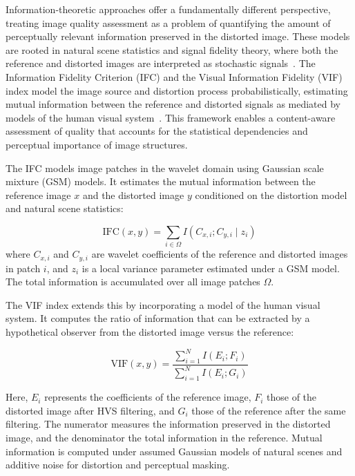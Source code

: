 Information-theoretic approaches offer a fundamentally different perspective, treating image quality assessment as a problem of quantifying the amount of perceptually relevant information preserved in the distorted image. These models are rooted in natural scene statistics and signal fidelity theory, where both the reference and distorted images are interpreted as stochastic signals~\cite{sheikh2005ifc}. The Information Fidelity Criterion (IFC) and the Visual Information Fidelity (VIF) index model the image source and distortion process probabilistically, estimating mutual information between the reference and distorted signals as mediated by models of the human visual system~\cite{Sheikh2006VIF}. This framework enables a content-aware assessment of quality that accounts for the statistical dependencies and perceptual importance of image structures.

The IFC models image patches in the wavelet domain using Gaussian scale mixture (GSM) models. It estimates the mutual information between the reference image $x$ and the distorted image $y$ conditioned on the distortion model and natural scene statistics:

\begin{equation}
\text{IFC}(x, y) = \sum_{i \in \Omega} I(C_{x,i}; C_{y,i} \mid z_i)
\end{equation}
where $C_{x,i}$ and $C_{y,i}$ are wavelet coefficients of the reference and distorted images in patch $i$, and $z_i$ is a local variance parameter estimated under a GSM model. The total information is accumulated over all image patches $\Omega$.

The VIF index extends this by incorporating a model of the human visual system. It computes the ratio of information that can be extracted by a hypothetical observer from the distorted image versus the reference:

\begin{equation}
\text{VIF}(x, y) = \frac{\sum_{i=1}^{N} I(E_i; F_i)}{\sum_{i=1}^{N} I(E_i; G_i)}
\end{equation}

Here, $E_i$ represents the coefficients of the reference image, $F_i$ those of the distorted image after HVS filtering, and $G_i$ those of the reference after the same filtering. The numerator measures the information preserved in the distorted image, and the denominator the total information in the reference. Mutual information is computed under assumed Gaussian models of natural scenes and additive noise for distortion and perceptual masking.

